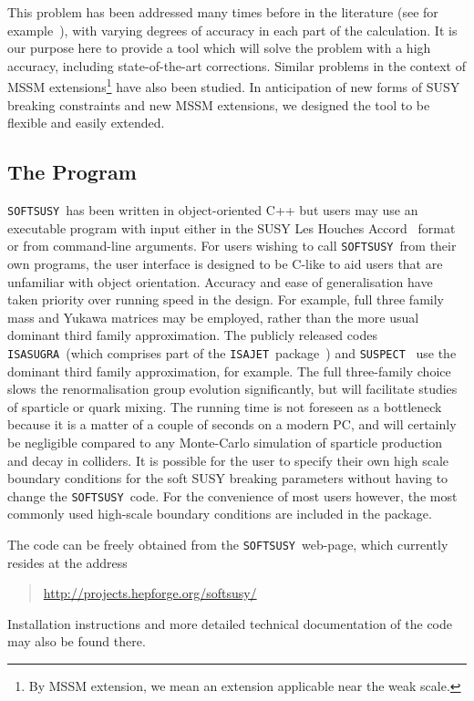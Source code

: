 \documentclass{article}
\def\SOFTSUSY{{\tt SOFTSUSY}}
\def\SUSPECT{{\tt SUSPECT}}
\def\ISAJET{{\tt ISASUGRA}}
\begin{document}
 This problem has been addressed many times before in the
literature (see for
example~\cite{Ross:1992tz,Barger:1994gh,Pierce:1997zz,Djouadi:1998di,Baer:1999sp}), 
with  varying degrees of accuracy in each
part of the calculation. It is our purpose here to provide a tool which will
solve the problem with a high accuracy, including state-of-the-art corrections.
Similar problems in the context of MSSM extensions\footnote{By MSSM extension,
we mean an extension applicable near the weak scale.} have also been
studied. In anticipation of new forms of SUSY breaking constraints and new
MSSM extensions, we designed the tool to be flexible and easily extended.

\subsection{The Program}

\SOFTSUSY~has been written in object-oriented C++ but users may use an
executable program with input either in the SUSY Les Houches
Accord~\cite{lhacc} 
format or from command-line arguments. For users wishing to call
\SOFTSUSY~from their own programs, the user interface is designed to be 
C-like to aid users that are unfamiliar with object orientation.
Accuracy and ease of generalisation have taken priority over running speed in the
design. For example,
full three family mass and Yukawa matrices may be employed, rather than
the more usual dominant third family approximation. The
publicly released codes \ISAJET~(which comprises part of the 
{\tt ISAJET}~package~\cite{Baer:1999sp}) and \SUSPECT~\cite{Djouadi:1998di}
use the dominant third family approximation, for example. 
The full three-family choice slows the renormalisation group evolution
significantly, but  
will facilitate studies of sparticle or quark mixing. The running time is not
foreseen as a bottleneck because it is a matter of a couple of seconds on a
modern PC, and will certainly be negligible compared to any Monte-Carlo
simulation of sparticle production and decay in colliders.
It is possible for the user to specify their own high scale boundary
conditions for the soft SUSY 
breaking parameters without having to change the \SOFTSUSY~code.
For the convenience of most users however, the most commonly used
high-scale boundary conditions are included in the package.

The code can be freely obtained from the \SOFTSUSY~web-page, which
currently resides at the address
\begin{quote}
\href{http://projects.hepforge.org/softsusy/}
{http://projects.hepforge.org/softsusy/} 
\end{quote}
Installation instructions and more detailed technical documentation of the
code may also be found there.
\end{document}
